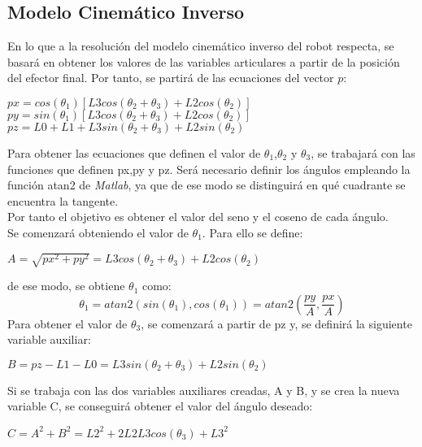 	\subsection{Modelo Cinemático Inverso}
	
	En lo que a la resolución del modelo cinemático inverso del robot respecta, se basará en obtener los valores de las variables articulares a partir de la posición del efector final. Por tanto, se partirá de las ecuaciones del vector $p$:
	
	\begin{center}
		$px=cos(\theta_{1})[L3cos(\theta_{2}+\theta_{3}) + L2cos(\theta_{2})]$ \\ 
		$py=sin(\theta_{1})[L3cos(\theta_{2}+\theta_{3}) + L2cos(\theta_{2})]$ \\ 
		$pz=L0 + L1 + L3sin(\theta_{2}+\theta_{3}) + L2sin(\theta_{2})$			
	\end{center}
	
	Para obtener las ecuaciones que definen el valor de $\theta_{1}$,$\theta_{2}$ y $\theta_{3}$, se trabajará con las funciones que definen px,py y pz. Será necesario definir los ángulos empleando la función atan2 de \textit{Matlab}, ya que de ese modo se distinguirá en qué cuadrante se encuentra la tangente.\\
	Por tanto el objetivo es obtener el valor del seno y el coseno de cada ángulo.\\
	
	Se comenzará obteniendo el valor de $\theta_{1}$. Para ello se define:\\
	\begin{center}
		$ A = \sqrt{px^{2}+py^{2}} = L3cos(\theta_{2}+\theta_{3}) + L2cos(\theta_{2})$
	\end{center}
	de ese modo, se obtiene $\theta_{1}$ como:\\
	\begin{equation}
	\theta_{1}=atan2(sin(\theta_{1}),cos(\theta_{1}))=atan2(\frac{py}{A},\frac{px}{A})
	\end{equation}
	Para obtener el valor de $\theta_{3}$, se comenzará a partir de pz y, se definirá la siguiente variable auxiliar:\\
	\begin{center}
		$ B=pz-L1-L0=L3sin(\theta_{2}+\theta_{3}) + L2sin(\theta_{2})$
	\end{center}
	Si se trabaja con las dos variables auxiliares creadas, A y B, y se crea la nueva variable C, se conseguirá obtener el valor del ángulo deseado:\\
	\begin{center}
		$C= A^{2} + B^{2} = L2^{2}+ 2L2L3cos(\theta_{3}) + L3^{2} $
	\end{center}
	

